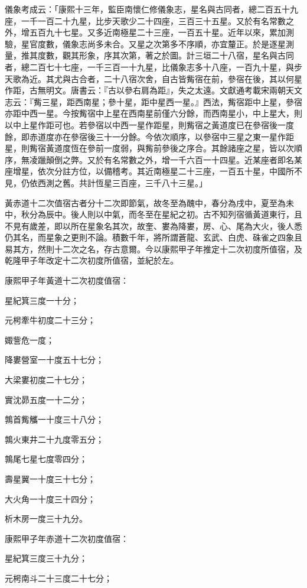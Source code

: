 \begin{pinyinscope}
儀象考成云：「康熙十三年，監臣南懷仁修儀象志，星名與古同者，總二百五十九座，一千一百二十九星，比步天歌少二十四座，三百三十五星。又於有名常數之外，增五百九十七星。又多近南極星二十三座，一百五十星。近年以來，累加測驗，星官度數，儀象志尚多未合。又星之次第多不序順，亦宜釐正。於是逐星測量，推其度數，觀其形象，序其次第，著之於圖。計三垣二十八宿，星名與古同者，總二百七十七座，一千三百一十九星，比儀象志多十八座，一百九十星，與步天歌為近。其尤與古合者，二十八宿次舍，自古皆觜宿在前，參宿在後，其以何星作距，古無明文。唐書云：『古以參右肩為距』，失之太遠。文獻通考載宋兩朝天文志云：『觜三星，距西南星；參十星，距中星西一星。』西法，觜宿距中上星，參宿亦距中西一星。今按觜宿中上星在西南星前僅六分餘，而西南星小，中上星大，則以中上星作距可也。若參宿以中西一星作距星，則觜宿之黃道度已在參宿後一度餘，即赤道度亦在參宿後三十一分餘。今依次順序，以參宿中三星之東一星作距星，則觜宿黃道度恆在參前一度弱，與觜前參後之序合。其餘諸座之星，皆以次順序，無凌躐顛倒之弊。又於有名常數之外，增一千六百一十四星。近某座者即名某座增星，依次分註方位，以備稽考。其近南極星二十三座，一百五十星，中國所不見，仍依西測之舊。共計恆星三百座，三千八十三星。」

黃赤道十二次值宿古者分十二次即節氣，故冬至為醜中，春分為戌中，夏至為未中，秋分為辰中。後人則以中氣，而冬至在星紀之初。古不知列宿循黃道東行，且不見有歲差，即以所在星象名其次，故奎、婁為降婁，房、心、尾為大火，後人悉仍其名，而星象之更則不論。積數千年，將所謂蒼龍、玄武、白虎、硃雀之四象且易其方，然則十二次之名，存古意爾。今以康熙甲子年推定十二次初度所值宿，及乾隆甲子年改定十二次初度所值宿，並紀於左。

康熙甲子年黃道十二次初度值宿：

星紀箕三度一十分；

元枵牽牛初度二十三分；

娵訾危一度；

降婁營室一十度五十七分；

大梁婁初度二十七分；

實沈昴五度一十二分；

鶉首觜觿一十度三十八分；

鶉火東井二十九度零五分；

鶉尾七星七度零四分；

壽星翼一十度三十七分；

大火角一十度三十四分；

析木房一度三十九分。

康熙甲子年赤道十二次初度值宿：

星紀箕三度三十九分；

元枵南斗二十三度二十七分；


\end{pinyinscope}
